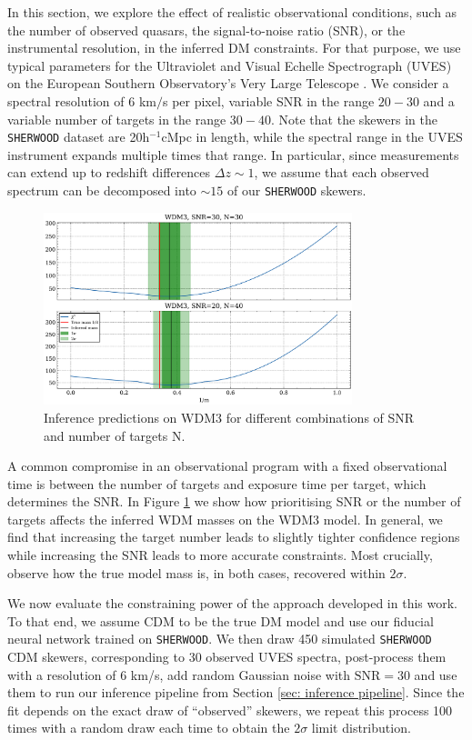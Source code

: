 In this section, we explore the effect of realistic observational conditions, such as the number of observed quasars, the signal-to-noise ratio (SNR), or the instrumental resolution, in the inferred DM constraints. For that purpose, we use typical parameters for the Ultraviolet and Visual Echelle Spectrograph (UVES) on the European Southern Observatory's Very Large Telescope \cite{Murphy_2018}. We consider a spectral resolution of $6$ km$/$s per pixel, variable SNR in the range $20-30$ and a variable number of targets in the range $30-40$. Note that the skewers in the \texttt{SHERWOOD} dataset are 20h$^{-1}$cMpc in length, while the spectral range in the UVES instrument expands multiple times that range. In particular, since measurements can extend up to redshift differences $\Delta z \sim 1$, we assume that each observed spectrum can be decomposed into $\sim 15$ of our \texttt{SHERWOOD} skewers.


\begin{figure}
    \centering
    \includegraphics[width=0.8\textwidth]{img/ML/SNR_vs_N.png}
    \caption{Inference predictions on WDM3 for different combinations of SNR and number of targets N.}
    \label{fig: inference snr vs n}
\end{figure}

A common compromise in an observational program with a fixed observational time is between the number of targets and exposure time per target, which determines the SNR. In Figure \ref{fig: inference snr vs n} we show how prioritising SNR or the number of targets affects the inferred WDM masses on the WDM3 model. In general, we find that increasing the target number leads to slightly tighter confidence regions while increasing the SNR leads to more accurate constraints. Most crucially, observe how the true model mass is, in both cases, recovered within $2\sigma$.

We now evaluate the constraining power of the approach developed in this work. To that end, we assume CDM to be the true DM model and use our fiducial neural network trained on \texttt{SHERWOOD}. We then draw 450 simulated \texttt{SHERWOOD} CDM skewers, corresponding to 30 observed UVES spectra, post-process them with a resolution of 6 km/s, add random Gaussian noise with $\text{SNR}=30$ and use them to run our inference pipeline from Section \ref{sec: inference pipeline}. Since the fit depends on the exact draw of ``observed'' skewers, we repeat this process 100 times with a random draw each time to obtain the $2\sigma$ limit distribution.

